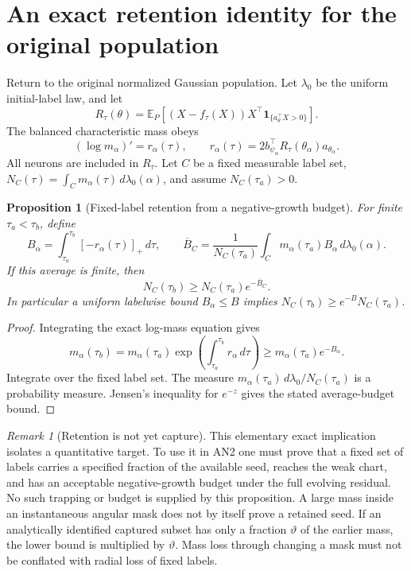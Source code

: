 \documentclass[11pt]{article}
\numberwithin{equation}{section}
\newtheorem{proposition}[theorem]{Proposition}
\theoremstyle{remark}\newtheorem{remark}[theorem]{Remark}
\newcommand{\E}{\mathbb E}
\newcommand{\dd}{\,d}
\begin{document}
\section{An exact retention identity for the original population}
\label{inc:LPR:v1:retention}
Return to the original normalized Gaussian population. Let $\lambda_0$
be the uniform initial-label law, and let
\[
 R_\tau(\theta)=\E_P[(X-f_\tau(X))X^\top
                 \mathbf1_{\{a_\theta^\top X>0\}}].
\]
The balanced characteristic mass obeys
\[
 (\log m_\alpha)'=r_\alpha(\tau),\qquad
 r_\alpha(\tau)=2b_{\psi_\alpha}^\top
                    R_\tau(\theta_\alpha)a_{\theta_\alpha}.
\]
All neurons are included in $R_\tau$. Let $C$ be a fixed measurable label
set, $N_C(\tau)=\int_Cm_\alpha(\tau)\dd\lambda_0(\alpha)$, and assume
$N_C(\tau_a)>0$.

\begin{proposition}[Fixed-label retention from a negative-growth budget]
\label{inc:LPR:v1:retentiontheorem}
For finite $\tau_a<\tau_b$, define
\[
 B_\alpha=\int_{\tau_a}^{\tau_b}[-r_\alpha(\tau)]_+\dd\tau,
 \qquad
 \overline B_C=\frac1{N_C(\tau_a)}
      \int_Cm_\alpha(\tau_a)B_\alpha\dd\lambda_0(\alpha).
\]
If this average is finite, then
\[
 \boxed{N_C(\tau_b)\ge N_C(\tau_a)e^{-\overline B_C}.}
\]
In particular a uniform labelwise bound $B_\alpha\le B$ implies
$N_C(\tau_b)\ge e^{-B}N_C(\tau_a)$.
\end{proposition}
\begin{proof}
Integrating the exact log-mass equation gives
\[
 m_\alpha(\tau_b)=m_\alpha(\tau_a)
       \exp\!\left(\int_{\tau_a}^{\tau_b}r_\alpha\dd\tau\right)
 \ge m_\alpha(\tau_a)e^{-B_\alpha}.
\]
Integrate over the fixed label set. The measure
$m_\alpha(\tau_a)\dd\lambda_0/N_C(\tau_a)$ is a probability measure.
Jensen's inequality for $e^{-z}$ gives the stated average-budget bound.
\end{proof}

\begin{remark}[Retention is not yet capture]
This elementary exact implication isolates a quantitative target. To use
it in AN2 one must prove that a fixed set of labels carries a specified
fraction of the available seed, reaches the weak chart, and has an
acceptable negative-growth budget under the full evolving residual.
No such trapping or budget is supplied by this proposition. A large mass
inside an instantaneous angular mask does not by itself prove a retained
seed. If an analytically identified captured subset has only a fraction
$\vartheta$ of the earlier mass, the lower bound is multiplied by
$\vartheta$. Mass loss through changing a mask must not be conflated with
radial loss of fixed labels.
\end{remark}
\end{document}
